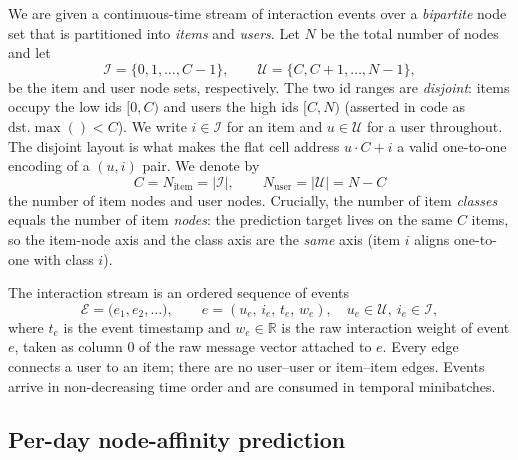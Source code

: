 \documentclass[11pt]{article}
\begin{document}
We are given a continuous-time stream of interaction events over a
\emph{bipartite} node set that is partitioned into \emph{items} and \emph{users}.
Let $N$ be the total number of nodes and let
\begin{equation}
  \mathcal{I} = \{0,1,\dots,C-1\}, \qquad
  \mathcal{U} = \{C, C+1,\dots,N-1\},
\end{equation}
be the item and user node sets, respectively. The two id ranges are
\emph{disjoint}: items occupy the low ids $[0,C)$ and users the high ids
$[C,N)$ (asserted in code as $\mathrm{dst}.\max()<C$). We write $i\in\mathcal{I}$
for an item and $u\in\mathcal{U}$ for a user throughout. The disjoint layout is
what makes the flat cell address $u\cdot C + i$ a valid one-to-one encoding of a
$(u,i)$ pair. We denote by
\begin{equation}
  C = N_{\text{item}} = |\mathcal{I}|, \qquad
  N_{\text{user}} = |\mathcal{U}| = N - C
\end{equation}
the number of item nodes and user nodes. Crucially, the number of item
\emph{classes} equals the number of item \emph{nodes}: the prediction target
lives on the same $C$ items, so the item-node axis and the class axis are the
\emph{same} axis (item $i$ aligns one-to-one with class $i$).

The interaction stream is an ordered sequence of events
\begin{equation}
  \mathcal{E} = \big(e_1, e_2, \dots\big), \qquad
  e = (u_e,\, i_e,\, t_e,\, w_e), \quad u_e\in\mathcal{U},\ i_e\in\mathcal{I},
\end{equation}
where $t_e$ is the event timestamp and $w_e\in\mathbb{R}$ is the raw interaction
weight of event $e$, taken as column $0$ of the raw message vector attached to
$e$. Every edge connects a user to an item; there are no user--user or
item--item edges. Events arrive in non-decreasing time order and are consumed in
temporal minibatches.

\subsection{Per-day node-affinity prediction}
\end{document}
